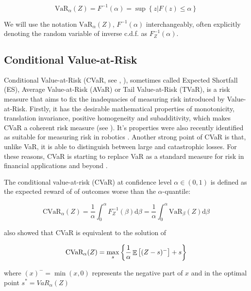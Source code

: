 \begin{equation}
\text{VaR}_\alpha(Z)=F^{-1}(\alpha)=\sup\left\lbrace z | F(z) \le \alpha \right\rbrace
\end{equation}

We will use the notation $\text{VaR}_\alpha(Z)$, $F^{-1}(\alpha)$ interchangeably, often explicitly denoting the random variable of inverse c.d.f. as $F^{-1}_Z(\alpha)$.

\subsection{Conditional Value-at-Risk}

Conditional Value-at-Risk (CVaR, see \citet{rockafellar2000optimization}, \citep{rockafellar2002conditional}), sometimes called Expected Shortfall (ES), Average Value-at-Risk (AVaR) or Tail Value-at-Risk (TVaR), is a risk measure that aims to fix the inadequacies of measuring risk introduced by Value-at-Risk. Firstly, it has the desirable mathematical properties of monotonicity, translation invariance, positive homogeneity and subadditivity, which makes CVaR a coherent risk measure (see \citet{artzner1999coherent}). It's properties were also recently identified as suitable for measuring risk in robotics \cite{majumdar2017should}. Another strong point of CVaR is that, unlike VaR, it is able to distinguish between large and catastrophic losses. For these reasons, CVaR is starting to replace VaR as a standard measure for risk in financial applications \citep{basel2013fundamental} and beyond \cite{something}.

The conditional value-at-risk (CVaR) at confidence level $\alpha \in (0,1)$ is defined as the expected reward of of outcomes worse than the $\alpha$-quantile:

\begin{equation}\label{eqn:prelim:cvar}
\text{CVaR}_\alpha(Z) = \dfrac{1}{\alpha}\int_0^\alpha F^{-1}_Z(\beta) \text{d}\beta = \dfrac{1}{\alpha}\int_0^\alpha \text{VaR}_\beta(Z) \text{d}\beta
\end{equation}

\citet{rockafellar2000optimization} also showed that CVaR is equivalent to the solution of

\begin{equation}\label{eqn:prelim:cvar2}
\text{CVaR}_\alpha(Z)=
\max_s\left\lbrace \dfrac{1}{\alpha}\mathop{\mathbb{E}}
\left[ (Z-s)^-\right] + s  \right\rbrace 
\end{equation}

where $(x)^- = \min(x, 0)$ represents the negative part of $x$ and in the optimal point $s^* = VaR_\alpha(Z)$

